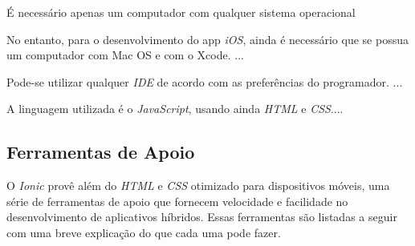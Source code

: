 É necessário apenas um computador com qualquer sistema operacional

No entanto, para o desenvolvimento do app \textit{iOS}, ainda é necessário que se possua um computador com Mac OS e com o Xcode.
...

Pode-se utilizar qualquer \textit{IDE} de acordo com as preferências do programador.
...

A linguagem utilizada é o \textit{JavaScript}, usando ainda \textit{HTML} e \textit{CSS}....


\subsection{Ferramentas de Apoio} \label{subsec:ionicferramentasapoio}

O \textit{Ionic} provê além do \textit{HTML} e \textit{CSS} otimizado para dispositivos móveis, uma série de ferramentas de 
apoio que fornecem velocidade e facilidade no desenvolvimento de aplicativos híbridos. Essas ferramentas são listadas a seguir 
com uma breve explicação do que cada uma pode fazer.

